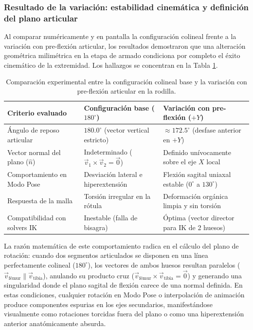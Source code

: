 \subsubsection{Resultado de la variación: estabilidad cinemática y definición del plano articular}

Al comparar numéricamente y en pantalla la configuración colineal frente a la variación con pre-flexión articular, los resultados demostraron que una alteración geométrica milimétrica en la etapa de armado condiciona por completo el éxito cinemático de la extremidad. Los hallazgos se concentran en la Tabla \ref{tab:variacion_act1}.

\begin{table}[H]
\centering
\small
\begin{tabular}{@{}p{4.2cm}p{5.4cm}p{5.4cm}@{}}
\toprule
\textbf{Criterio evaluado} & \textbf{Configuración base ($180^\circ$)} & \textbf{Variación con pre-flexión ($+Y$)} \\
\midrule
Ángulo de reposo articular & $180.0^\circ$ (vector vertical estricto) & $\approx 172.5^\circ$ (desfase anterior en $+Y$) \\
Vector normal del plano ($\hat{n}$) & Indeterminado ($\vec{v}_1 \times \vec{v}_2 = \vec{0}$) & Definido unívocamente sobre el eje $X$ local \\
Comportamiento en Modo Pose & Desviación lateral e hiperextensión & Flexión sagital uniaxal estable ($0^\circ$ a $130^\circ$) \\
Respuesta de la malla & Torsión irregular en la rótula & Deformación orgánica limpia y sin torsión \\
Compatibilidad con solvers IK & Inestable (falla de bisagra) & Óptima (vector director para IK de 2 huesos) \\
\bottomrule
\end{tabular}
\caption{Comparación experimental entre la configuración colineal base y la variación con pre-flexión articular en la rodilla.}
\label{tab:variacion_act1}
\end{table}

La razón matemática de este comportamiento radica en el cálculo del plano de rotación: cuando dos segmentos articulados se disponen en una línea perfectamente colineal ($180^\circ$), los vectores de ambos huesos resultan paralelos ($\vec{v}_{\text{fémur}} \parallel \vec{v}_{\text{tibia}}$), anulando su producto cruz ($\vec{v}_{\text{fémur}} \times \vec{v}_{\text{tibia}} = \vec{0}$) y generando una singularidad donde el plano sagital de flexión carece de una normal definida. En estas condiciones, cualquier rotación en Modo Pose o interpolación de animación produce componentes espurias en los ejes secundarios, manifestándose visualmente como rotaciones torcidas fuera del plano o como una hiperextensión anterior anatómicamente absurda. 


